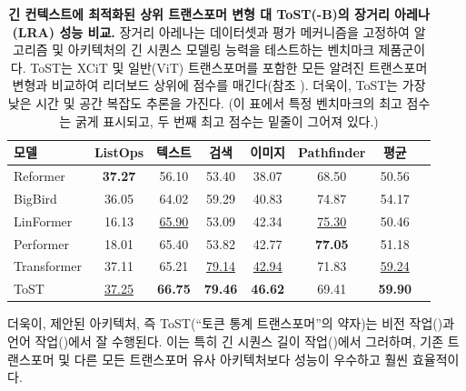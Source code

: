 \documentclass[../../book-main_ko.tex]{subfiles}
\begin{document}
\begin{table}
    \centering
    
    \begin{tabular}{@{}lccccccc@{}}
            \toprule
            모델        & ListOps  & 텍스트     & 검색 & 이미지    & Pathfinder & 평균      \\
            \midrule
            \midrule
            Reformer              & \textbf{37.27} & 56.10             & 53.40              & 38.07             & 68.50               & 50.56             \\
            BigBird               & 36.05             & 64.02             & 59.29              & 40.83             & 74.87                & 54.17             \\
            LinFormer         & 16.13             & \underline{65.90} & 53.09              & 42.34             & \underline{75.30}               & 50.46             \\
            Performer             & 18.01             & 65.40             & 53.82              & 42.77             & \textbf{77.05}                & 51.18             \\
            Transformer           & 37.11             & 65.21             & \underline{79.14}              & \underline{42.94}             & 71.83              & \underline{59.24}            \\
            ToST & \underline{37.25}    & \textbf{66.75}    & \textbf{79.46}     & \textbf{46.62}    &    69.41      &     \textbf{59.90}\\
            
            \bottomrule
        \end{tabular}%
    \caption{\small \textbf{긴 컨텍스트에 최적화된 상위 트랜스포머 변형 대 ToST(-B)의 장거리 아레나(LRA) 성능 비교.} 장거리 아레나는 데이터셋과 평가 메커니즘을 고정하여 알고리즘 및 아키텍처의 긴 시퀀스 모델링 능력을 테스트하는 벤치마크 제품군이다. ToST는 XCiT 및 일반(ViT) 트랜스포머를 포함한 모든 알려진 트랜스포머 변형과 비교하여 리더보드 상위에 점수를 매긴다(참조 ). 더욱이, ToST는 가장 낮은 시간 및 공간 복잡도 추론을 가진다. (이 표에서 특정 벤치마크의 최고 점수는 굵게 표시되고, 두 번째 최고 점수는 밑줄이 그어져 있다.)}
    \label{tab:tost_lra_results}
\end{table}

더욱이, 제안된 아키텍처, 즉 ToST(``토큰 통계 트랜스포머''의 약자)는 비전 작업()과 언어 작업()에서 잘 수행된다. 이는 특히 긴 시퀀스 길이 작업()에서 그러하며, 기존 트랜스포머 및 다른 모든 트랜스포머 유사 아키텍처보다 성능이 우수하고 훨씬 효율적이다.
\end{document}
